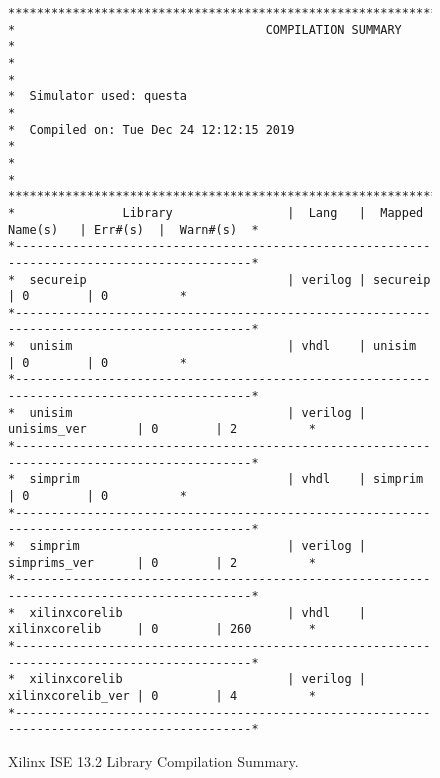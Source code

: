 \documentclass[10pt,twoside]{article}
\begin{document}
%
\begin{figure}[t]
\small
\begin{minipage}{\textwidth}
\begin{verbatim}
**********************************************************************************************
*                                   COMPILATION SUMMARY                                      *
*                                                                                            *
*  Simulator used: questa                                                                    *
*  Compiled on: Tue Dec 24 12:12:15 2019                                                     *
*                                                                                            *
**********************************************************************************************
*               Library                |  Lang   |  Mapped Name(s)   | Err#(s)  |  Warn#(s)  *
*--------------------------------------------------------------------------------------------*
*  secureip                            | verilog | secureip          | 0        | 0          *
*--------------------------------------------------------------------------------------------*
*  unisim                              | vhdl    | unisim            | 0        | 0          *
*--------------------------------------------------------------------------------------------*
*  unisim                              | verilog | unisims_ver       | 0        | 2          *
*--------------------------------------------------------------------------------------------*
*  simprim                             | vhdl    | simprim           | 0        | 0          *
*--------------------------------------------------------------------------------------------*
*  simprim                             | verilog | simprims_ver      | 0        | 2          *
*--------------------------------------------------------------------------------------------*
*  xilinxcorelib                       | vhdl    | xilinxcorelib     | 0        | 260        *
*--------------------------------------------------------------------------------------------*
*  xilinxcorelib                       | verilog | xilinxcorelib_ver | 0        | 4          *
*--------------------------------------------------------------------------------------------*
\end{verbatim}
\end{minipage}
\caption{Xilinx ISE 13.2 Library Compilation Summary.}
\label{fig:ise_libraries}
\end{figure}
\end{document}
